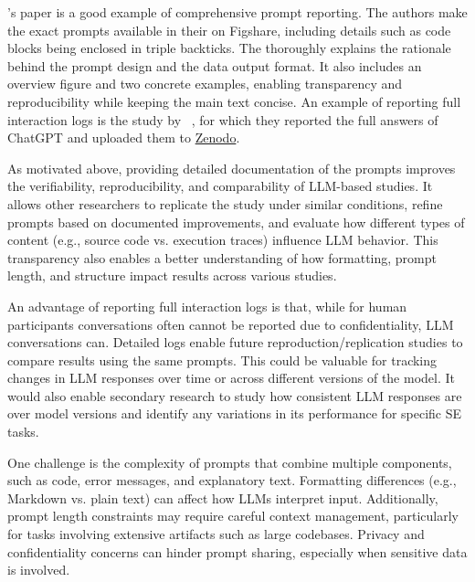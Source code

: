 \citeauthor{Liang2024}'s paper is a good example of comprehensive prompt reporting.
The authors make the exact prompts available in their \supplementarymaterial on Figshare, including details such as code blocks being enclosed in triple backticks.
The \paper thoroughly explains the rationale behind the prompt design and the data output format.
It also includes an overview figure and two concrete examples, enabling transparency and reproducibility while keeping the main text concise.
An example of reporting full interaction logs is the study by \citeauthor{ronanki2023investigating}~\cite{ronanki2023investigating}, for which they reported the full answers of ChatGPT and uploaded them to \href{https://zenodo.org/records/8124936}{Zenodo}. 


As motivated above, providing detailed documentation of the prompts improves the verifiability, reproducibility, and comparability of LLM-based studies.
It allows other researchers to replicate the study under similar conditions, refine prompts based on documented improvements, and evaluate how different types of content (e.g., source code vs. execution traces) influence LLM behavior.
This transparency also enables a better understanding of how formatting, prompt length, and structure impact results across various studies.

An advantage of reporting full interaction logs is that, while for human participants conversations often cannot be reported due to confidentiality, LLM conversations can.
Detailed logs enable future reproduction/replication studies to compare results using the same prompts.
This could be valuable for tracking changes in LLM responses over time or across different versions of the model.
It would also enable secondary research to study how consistent LLM responses are over model versions and identify any variations in its performance for specific SE tasks.


One challenge is the complexity of prompts that combine multiple components, such as code, error messages, and explanatory text.
Formatting differences (e.g., Markdown vs. plain text) can affect how LLMs interpret input.
Additionally, prompt length constraints may require careful context management, particularly for tasks involving extensive artifacts such as large codebases.
Privacy and confidentiality concerns can hinder prompt sharing, especially when sensitive data is involved.


